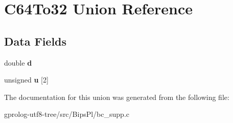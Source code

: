 \hypertarget{unionC64To32}{}\section{C64\+To32 Union Reference}
\label{unionC64To32}
\subsection*{Data Fields}
\begin{DoxyCompactItemize}
\item 
double {\bfseries d}\hypertarget{unionC64To32_a153fec5a65f5557d9e40a57b95ae6dc0}{}\label{unionC64To32_a153fec5a65f5557d9e40a57b95ae6dc0}

\item 
unsigned {\bfseries u} \mbox{[}2\mbox{]}\hypertarget{unionC64To32_aa82ad59db4f982b9779320862ef7f50f}{}\label{unionC64To32_aa82ad59db4f982b9779320862ef7f50f}

\end{DoxyCompactItemize}


The documentation for this union was generated from the following file\+:\begin{DoxyCompactItemize}
\item 
gprolog-\/utf8-\/tree/src/\+Bips\+Pl/bc\+\_\+supp.\+c\end{DoxyCompactItemize}

